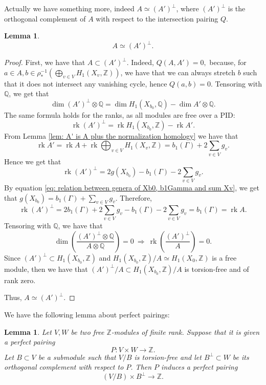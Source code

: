 \documentclass[a4paper,12 pt,titlepage,twoside]{book}
\newcommand{\numberset}{\mathbb}
\newcommand{\Z}{\numberset{Z}}
\newcommand{\Q}{\numberset{Q}}
\DeclareMathOperator{\rk}{rk}
\theoremstyle{plain}
\theoremstyle{theorem}
\newtheorem{lemma}[thm]{Lemma}
\theoremstyle{definition}
\theoremstyle{remark}
\begin{document}
	Actually we have something more, indeed $A \simeq (A')^\bot$, where $(A')^\bot$ is the orthogonal complement of $A$ with respect to the intersection pairing $Q$.
	\begin{lemma}
		$$A \simeq (A')^\bot.$$
	\end{lemma}
	\begin{proof}
		First, we have that $A \subset (A')^\bot$. Indeed, $Q(A,A')=0,$ because, for $a \in A, b \in \rho_*^{-1}\left(\bigoplus_{v \in V} H_1(X_v,\Z)\right)$, we have that we can always stretch $b$ such that it does not intersect any vanishing cycle, hence $Q(a,b)=0.$
		Tensoring with $\Q$, we get that $$\dim (A')^\bot \otimes \Q = \dim H_1(X_{b_0},\Q) - \dim A' \otimes \Q.$$ The same formula holds for the ranks, as all modules are free over a PID: $$\rk (A')^\bot = \rk H_1(X_{b_0},\Z) - \rk A'.$$ From Lemma \ref{lem: A' is A plus the normalization homology} we have that $$\rk A' = \rk A + \rk \bigoplus_{v \in V} H_1(X_v,\Z) = b_1(\Gamma) + 2 \sum_{v \in V} g_v.$$ Hence we get that $$\rk (A')^\bot = 2g(X_{b_0}) - b_1(\Gamma) - 2 \sum_{v \in V} g_v.$$ By equation \eqref{eq: relation between genera of Xb0, b1Gamma and sum Xv}, we get that $g(X_{b_0}) = b_1(\Gamma) + \sum_{v \in V} g_v.$ Therefore, $$\rk(A')^\bot = 2b_1(\Gamma) + 2\sum_{v \in V} g_v - b_1(\Gamma) -2\sum_{v \in V} g_v = b_1(\Gamma) = \rk A.$$
		Tensoring with $\Q$, we have that $$\dim \left(\frac{(A')^\perp \otimes \Q}{A \otimes \Q}\right) = 0 \ \Rightarrow \ \rk \left(\frac{(A')^\perp}{A}\right)
		 =0.$$ Since $(A')^\perp \subset H_1(X_{b_0},\Z)$ and $H_1(X_{b_0},\Z) /A \simeq H_1(X_0,\Z)$ is a free module, then we have that $(A')^\perp /A \subset H_1(X_{b_0},\Z)/A$ is torsion-free and of rank zero.
		
		 Thus, $A \simeq (A')^\bot.$
	\end{proof}
	We have the following lemma about perfect pairings: 
	\begin{lemma}
		Let $V,W$ be two free $\Z$-modules of finite rank. Suppose that it is given a perfect pairing $$P \colon V \times W \rightarrow \Z.$$ Let $B \subset V$ be a submodule such that $V/B$ is torsion-free and let $B^\perp \subset W$ be its orthogonal complement with respect to $P$. Then $P$ induces a perfect pairing $$\left(V/B\right) \times B^\perp \rightarrow \Z.$$
	\end{lemma}
\end{document}
